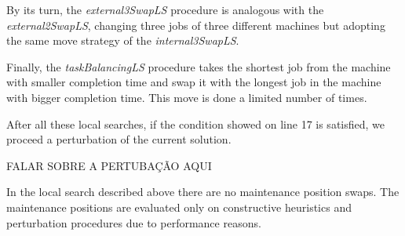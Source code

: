 \documentclass[a4paper,11pt]{article}
\begin{document}
By its turn, the \emph{external3SwapLS} procedure is analogous with the \emph{external2SwapLS}, changing three jobs of three different machines but adopting the same move strategy of the \emph{internal3SwapLS}. 

Finally, the \emph{taskBalancingLS} procedure takes the shortest job from the machine with smaller completion time and swap it with the longest job in the machine with bigger completion time. This move is done a limited number of times. 

After all these local searches, if the condition showed on line 17 is satisfied, we proceed a perturbation of the current solution. 

FALAR SOBRE A PERTUBA\c C\~AO AQUI


In the local search described above there are no maintenance position swaps. The maintenance positions are evaluated only on constructive heuristics and perturbation procedures due to performance reasons. 


~\\


\end{document}
